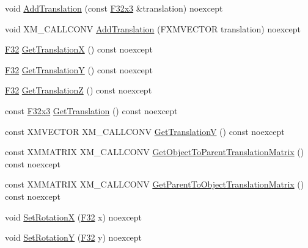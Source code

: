 \begin{DoxyCompactItemize}
\item 
void \mbox{\hyperlink{classmage_1_1_local_transform_ae859ff5d5f4bc7d106b8c4cf233c8f8a}{Add\+Translation}} (const \mbox{\hyperlink{namespacemage_a0fef5ab4e073c2d9ea876fefa3da4233}{F32x3}} \&translation) noexcept
\item 
void X\+M\+\_\+\+C\+A\+L\+L\+C\+O\+NV \mbox{\hyperlink{classmage_1_1_local_transform_a43e89031fcab7af7e7fb1c7d80e06438}{Add\+Translation}} (F\+X\+M\+V\+E\+C\+T\+OR translation) noexcept
\item 
\mbox{\hyperlink{namespacemage_aa97e833b45f06d60a0a9c4fc22ae02c0}{F32}} \mbox{\hyperlink{classmage_1_1_local_transform_ae021c17cf996088044a9c4f7be1601b8}{Get\+TranslationX}} () const noexcept
\item 
\mbox{\hyperlink{namespacemage_aa97e833b45f06d60a0a9c4fc22ae02c0}{F32}} \mbox{\hyperlink{classmage_1_1_local_transform_a31441b5c6cca77b6f0e8c5cc9c3bf3f0}{Get\+TranslationY}} () const noexcept
\item 
\mbox{\hyperlink{namespacemage_aa97e833b45f06d60a0a9c4fc22ae02c0}{F32}} \mbox{\hyperlink{classmage_1_1_local_transform_a09d94a592dab22c23e664402144d75bc}{Get\+TranslationZ}} () const noexcept
\item 
const \mbox{\hyperlink{namespacemage_a0fef5ab4e073c2d9ea876fefa3da4233}{F32x3}} \mbox{\hyperlink{classmage_1_1_local_transform_a302713192aca919d01e02fb4eac2d2c5}{Get\+Translation}} () const noexcept
\item 
const X\+M\+V\+E\+C\+T\+OR X\+M\+\_\+\+C\+A\+L\+L\+C\+O\+NV \mbox{\hyperlink{classmage_1_1_local_transform_a18dc6111bfca7d24f3f24e2c1dff8d0b}{Get\+TranslationV}} () const noexcept
\item 
const X\+M\+M\+A\+T\+R\+IX X\+M\+\_\+\+C\+A\+L\+L\+C\+O\+NV \mbox{\hyperlink{classmage_1_1_local_transform_a417c97411f3214119a1e7298de4b1631}{Get\+Object\+To\+Parent\+Translation\+Matrix}} () const noexcept
\item 
const X\+M\+M\+A\+T\+R\+IX X\+M\+\_\+\+C\+A\+L\+L\+C\+O\+NV \mbox{\hyperlink{classmage_1_1_local_transform_aa64c46933f029f5952895a185b5fdd29}{Get\+Parent\+To\+Object\+Translation\+Matrix}} () const noexcept
\item 
void \mbox{\hyperlink{classmage_1_1_local_transform_a57f9839911c987f3cfc5b686a80c6624}{Set\+RotationX}} (\mbox{\hyperlink{namespacemage_aa97e833b45f06d60a0a9c4fc22ae02c0}{F32}} x) noexcept
\item 
void \mbox{\hyperlink{classmage_1_1_local_transform_a6fe237d9f56681271273f47b26b89ac0}{Set\+RotationY}} (\mbox{\hyperlink{namespacemage_aa97e833b45f06d60a0a9c4fc22ae02c0}{F32}} y) noexcept

\end{DoxyCompactItemize}
